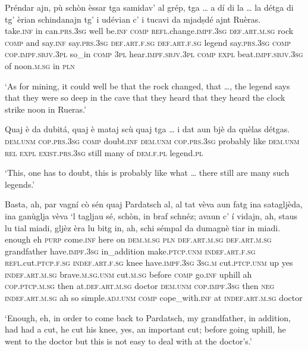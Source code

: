 \begin{linenumbers}
\gll Préndar ajn, pù schòn èssar tga samidav’ al grép, tga …  a dí di la … la détga di tg’ èrian schindanajn tg' i udévian c’ i tucavi da mjadṣdé ajnt Ruèras.\\
take.\textsc{inf} in can.\textsc{prs.3sg} well be.\textsc{inf} \textsc{comp} \textsc{refl}.change.\textsc{impf.3sg} \textsc{def.art.m.sg} rock \textsc{comp} {} and say.\textsc{inf} say.\textsc{prs.3sg} \textsc{def.art.f.sg} {} \textsc{def.art.f.sg} legend say.\textsc{prs.3sg}  \textsc{comp} \textsc{cop.impf.sbjv.3pl} so\_in \textsc{comp} \textsc{3pl} hear.\textsc{impf.sbjv.3pl} \textsc{comp} \textsc{expl} beat.\textsc{impf.sbjv.3sg} of noon.\textsc{m.sg} in \textsc{pln}\\
\end{linenumbers}
\medskip
\glt `As for mining, it could well be that the rock changed, that …, the legend says that they were so deep in the cave that they heard that they heard the clock strike noon in Rueras.'
\medskip

\begin{linenumbers}
\gll  Quaj è da dubitá, quaj è mataj scù quaj tga … i dat aun bjè da quèlas détgas.  \\
 \textsc{dem.unm}  \textsc{cop.prs.3sg} \textsc{comp} doubt.\textsc{inf} \textsc{dem.unm} \textsc{cop.prs.3sg} probably like \textsc{dem.unm} \textsc{rel} {} \textsc{expl} \textsc{exist.prs.3sg} still many of \textsc{dem.f.pl} legend.\textsc{pl} \\
\end{linenumbers}
\medskip
\glt `This, one has to doubt, this is probably like what … there still are many such legends.'
\medskip

\begin{linenumbers}
\gll   Basta, ah, par vagní cò sén quaj Pardatsch al, al tat vèva aun fatg ina satagljèda, ina ganùglja vèva `l tagljau sé, schòn, in braf schnéz; avaun c’ í vidajn, ah, staus lu tial miadi, gljèz èra lu bitg in, ah, schi sémpal da dumagnè tiar in miadi. \\
enough eh \textsc{purp} come.\textsc{inf} here on \textsc{dem.m.sg} \textsc{pln} \textsc{def.art.m.sg} \textsc{def.art.m.sg} grandfather have.\textsc{impf.3sg} in\_addition make.\textsc{ptcp.unm} \textsc{indef.art.f.sg} \textsc{refl.}cut.\textsc{ptcp.f.sg} \textsc{indef.art.f.sg} knee have.\textsc{impf.3sg} \textsc{3sg.m} cut.\textsc{ptcp.unm} up yes \textsc{indef.art.m.sg} brave.\textsc{m.sg.unm} cut.\textsc{m.sg} before \textsc{comp} go.\textsc{inf} uphill ah \textsc{cop.ptcp.m.sg} then  at.\textsc{def.art.m.sg} doctor \textsc{dem.unm} \textsc{cop.impf.3sg} then \textsc{neg} \textsc{indef.art.m.sg} ah so simple.\textsc{adj.unm} \textsc{comp} cope\_with.\textsc{inf} at \textsc{indef.art.m.sg} doctor\\
\end{linenumbers}
\medskip
\glt `Enough, eh, in order to come back to Pardatsch, my grandfather, in addition, had had a cut, he cut his knee, yes, an important cut; before going uphill, he went to the doctor but this is not easy to deal with at the doctor’s.'
\medskip

